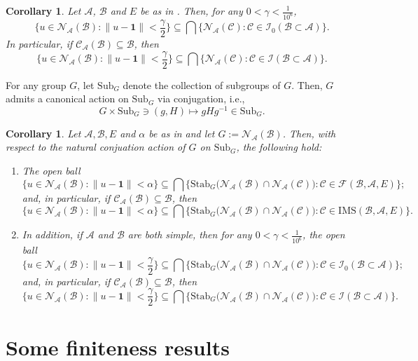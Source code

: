 \documentclass{amsart}
\numberwithin{equation}{section}
\newcommand{\IMS}{\mathrm{IMS}}
\newcommand{\mcal}{\mathcal}
\newcommand{\1}{\mathbf{1}}
\newcommand{\mA}{\mathcal{A}}
\newcommand{\mB}{\mathcal{B}}
\newcommand{\mC}{\mathcal{C}}
\newcommand{\mN}{\mathcal{N}}
\newtheorem{cor}[theorem]{Corollary}
\begin{document}
\begin{cor}\label{u-in-normalizer-simple}
Let $\mA$, $\mB$ and $E$ be as in .  Then,
for any $0< \gamma < \frac{1}{10^{6}}$,
\[
\Big\{ u \in {\mN}_{\mA}(\mB): \|u - \1\| < \frac{\gamma}{2}\Big\}
\subseteq \bigcap \Big\{ \mN_{\mA}(\mC): \mC \in \mcal{I}_0(\mB \subset
\mA)\Big\}.
\]
In particular, if $\mC_{\mA}(\mB) \subseteq \mB$, then 
\[
\Big\{ u \in {\mN}_{\mA}(\mB): \|u - \1\| < \frac{\gamma}{2}\Big\}
\subseteq \bigcap \Big\{ \mN_{\mA}(\mC): \mC \in \mcal{I}(\mB \subset
\mA)\Big\}.
\]
  \end{cor}

For any group $G$, let $\text{Sub}_G$ denote the collection of 
subgroups of $G$.  Then, $G$ admits a canonical action on
$\text{Sub}_G$ via conjugation, i.e.,
\[
G \times \text{Sub}_G \ni (g, H) \mapsto gH g^{-1} \in \text{Sub}_G.
\]
\begin{cor}
  Let $\mA, \mB, E$ and $\alpha $ be as in
   and let $G:=\mN_{\mA}(\mB)$. Then, with
  respect to the natural conjuation action of $G$ on $\mathrm{Sub}_G$,
  the following hold:
  \begin{enumerate}
\item     The open ball
  \[
  \{ u\in \mN_{\mA}(\mB) : \| u - \1\| < \alpha\}
  \subseteq \bigcap\big\{ \mathrm{Stab}_G\big(\mN_{\mA}(\mB) \cap
  \mN_{\mA}(\mC) \big) : \mC \in \mcal{F}(\mB, \mA, E)\big\};
  \]
and, in particular, if $\mC_{\mA}(\mB) \subseteq \mB$, then     
  \[
  \{ u\in \mN_{\mA}(\mB) : \| u - \1\| < \alpha\}
  \subseteq \bigcap\big\{ \mathrm{Stab}_G\big(\mN_{\mA}(\mB) \cap
  \mN_{\mA}(\mC) \big) : \mC \in \IMS(\mB, \mA, E)\big\}.
  \]
\item In addition, if $\mA$ and $\mB$ are both simple, then for any
  $0 < \gamma < \frac{1}{10^6}$, the open ball
 \[
 \Big\{ u\in \mN_{\mA}(\mB) : \| u - \1\| < \frac{\gamma}{2}\Big\}
  \subseteq \bigcap\big\{ \mathrm{Stab}_G\big(\mN_{\mA}(\mB) \cap
  \mN_{\mA}(\mC) \big) : \mC \in \mcal{I}_0(\mB \subset \mA)\big\};
  \]
and, in particular, if $\mC_{\mA}(\mB) \subseteq \mB$, then     
 \[
 \Big\{ u\in \mN_{\mA}(\mB) : \| u - \1\| < \frac{\gamma}{2}\Big\}
  \subseteq \bigcap\big\{ \mathrm{Stab}_G\big(\mN_{\mA}(\mB) \cap
  \mN_{\mA}(\mC) \big) : \mC \in \mcal{I}(\mB \subset \mA)\big\}.
  \]
  \end{enumerate}

\end{cor}

\section{Some finiteness results}\label{finiteness-results}
\end{document}
